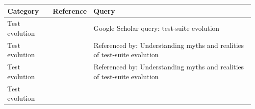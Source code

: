 \documentclass[]{book}
\begin{document}
\begin{longtable}[]{@{}lll@{}}
\toprule
\begin{minipage}[b]{0.19\columnwidth}\raggedright\strut
Category\strut
\end{minipage} & \begin{minipage}[b]{0.41\columnwidth}\raggedright\strut
Reference\strut
\end{minipage} & \begin{minipage}[b]{0.32\columnwidth}\raggedright\strut
Query\strut
\end{minipage}\tabularnewline
\midrule
\endhead
\begin{minipage}[t]{0.19\columnwidth}\raggedright\strut
Test evolution\strut
\end{minipage} & \begin{minipage}[t]{0.41\columnwidth}\raggedright\strut
\citet{supportingtestsuite}\strut
\end{minipage} & \begin{minipage}[t]{0.32\columnwidth}\raggedright\strut
Google Scholar query: test-suite evolution\strut
\end{minipage}\tabularnewline
\begin{minipage}[t]{0.19\columnwidth}\raggedright\strut
Test evolution\strut
\end{minipage} & \begin{minipage}[t]{0.41\columnwidth}\raggedright\strut
\citet{pinto2013}\strut
\end{minipage} & \begin{minipage}[t]{0.32\columnwidth}\raggedright\strut
Referenced by: Understanding myths and realities of test-suite
evolution\strut
\end{minipage}\tabularnewline
\begin{minipage}[t]{0.19\columnwidth}\raggedright\strut
Test evolution\strut
\end{minipage} & \begin{minipage}[t]{0.41\columnwidth}\raggedright\strut
\citet{bevan2005}\strut
\end{minipage} & \begin{minipage}[t]{0.32\columnwidth}\raggedright\strut
Referenced by: Understanding myths and realities of test-suite
evolution\strut
\end{minipage}\tabularnewline
\begin{minipage}[t]{0.19\columnwidth}\raggedright\strut
Test evolution\strut
\end{minipage} & \begin{minipage}[t]{0.41\columnwidth}\raggedright\strut

\end{minipage}
\end{longtable}
\end{document}
